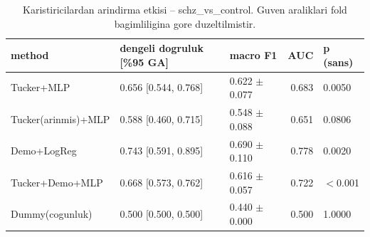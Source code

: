 \begin{table}[htbp]
  \centering
  \caption{Karistiricilardan arindirma etkisi -- schz\_vs\_control. Guven araliklari fold bagimliligina gore duzeltilmistir.}
  \label{tab:deconf_schz_vs_control}
  \small
  \begin{tabular}{lllrl}
    \toprule
    method & dengeli dogruluk [\%95 GA] & macro F1 & AUC & p (sans) \\
    \midrule
    Tucker+MLP & 0.656 [0.544, 0.768] & 0.622 $\pm$ 0.077 & 0.683 & 0.0050 \\
    Tucker(arinmis)+MLP & 0.588 [0.460, 0.715] & 0.548 $\pm$ 0.088 & 0.651 & 0.0806 \\
    Demo+LogReg & 0.743 [0.591, 0.895] & 0.690 $\pm$ 0.110 & 0.778 & 0.0020 \\
    Tucker+Demo+MLP & 0.668 [0.573, 0.762] & 0.616 $\pm$ 0.057 & 0.722 & $<$0.001 \\
    Dummy(cogunluk) & 0.500 [0.500, 0.500] & 0.440 $\pm$ 0.000 & 0.500 & 1.0000 \\
    \bottomrule
  \end{tabular}
\end{table}
